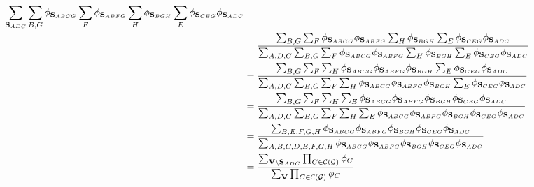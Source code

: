 \documentclass[11pt]{article}
\renewcommand{\vec}[1]{\mathbf{#1}}
\begin{document}
\begin{answertext}{23cm}{}
\begin{itemize}
\begin{align*}
{\sum_{\vec{S}_{ADC}}\sum_{B,G} \phi_{\vec{S}_{ABCG}} \sum_{F} \phi_{\vec{S}_{ABFG}} \sum_{H} \phi_{\vec{S}_{BGH}}\sum_{E}\phi_{\vec{S}_{CEG}}\phi_{\vec{S}_{ADC}}}\\
&=\frac{\sum_{B,G}\sum_{F} \phi_{\vec{S}_{ABCG}} \phi_{\vec{S}_{ABFG}} \sum_{H} \phi_{\vec{S}_{BGH}}\sum_{E}\phi_{\vec{S}_{CEG}}\phi_{\vec{S}_{ADC}}}
{\sum_{A,D,C}\sum_{B,G} \sum_{F} \phi_{\vec{S}_{ABCG}} \phi_{\vec{S}_{ABFG}} \sum_{H} \phi_{\vec{S}_{BGH}}\sum_{E}\phi_{\vec{S}_{CEG}}\phi_{\vec{S}_{ADC}}}\\
&=\frac{\sum_{B,G}\sum_{F}\sum_{H} \phi_{\vec{S}_{ABCG}} \phi_{\vec{S}_{ABFG}}  \phi_{\vec{S}_{BGH}}\sum_{E}\phi_{\vec{S}_{CEG}}\phi_{\vec{S}_{ADC}}}
{\sum_{A,D,C}\sum_{B,G} \sum_{F}\sum_{H} \phi_{\vec{S}_{ABCG}} \phi_{\vec{S}_{ABFG}}  \phi_{\vec{S}_{BGH}}\sum_{E}\phi_{\vec{S}_{CEG}}\phi_{\vec{S}_{ADC}}}\\
&=\frac{\sum_{B,G}\sum_{F} \sum_{H} \sum_{E}\phi_{\vec{S}_{ABCG}} \phi_{\vec{S}_{ABFG}} \phi_{\vec{S}_{BGH}}\phi_{\vec{S}_{CEG}}\phi_{\vec{S}_{ADC}}}
{\sum_{A,D,C}\sum_{B,G} \sum_{F}\sum_{H}\sum_{E} \phi_{\vec{S}_{ABCG}} \phi_{\vec{S}_{ABFG}}  \phi_{\vec{S}_{BGH}}\phi_{\vec{S}_{CEG}}\phi_{\vec{S}_{ADC}}}\\
&=\frac{\sum_{B,E,F,G,H} \phi_{\vec{S}_{ABCG}} \phi_{\vec{S}_{ABFG}} \phi_{\vec{S}_{BGH}}\phi_{\vec{S}_{CEG}}\phi_{\vec{S}_{ADC}}}
{\sum_{A,B,C,D,E,F,G,H} \phi_{\vec{S}_{ABCG}} \phi_{\vec{S}_{ABFG}} \phi_{\vec{S}_{BGH}}\phi_{\vec{S}_{CEG}}\phi_{\vec{S}_{ADC}}}\\
&=\frac{
\sum_{\vec{V} \setminus \vec{S}_{ADC}} \prod_{C \in {\cal C}({\cal G})} \phi_C
}{
\sum_{\vec{V}} \prod_{C \in {\cal C}({\cal G})} \phi_C
}
\end{align*}
\end{itemize}
\end{answertext}
\pagebreak
\end{document}
